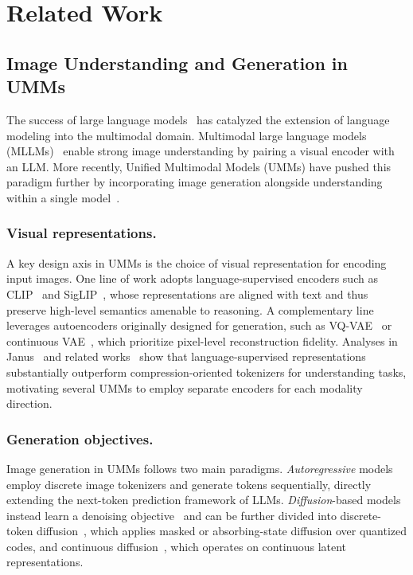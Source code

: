 \section{Related Work}
\subsection{Image Understanding and Generation in UMMs}
\label{subsec:taxonomy}
The success of large language models~\cite{floridi2020gpt, touvron2023llama} has catalyzed the extension of language modeling into the multimodal domain. Multimodal large language models (MLLMs)~\cite{bai2025qwen3, chen2024internvl, guo2025deepseek, liu2023visual} enable strong image understanding by pairing a visual encoder with an LLM. More recently, Unified Multimodal Models (UMMs) have pushed this paradigm further by incorporating image generation alongside understanding within a single model~\cite{team2024chameleon, wu2025janus, deng2025bagel, xin2025lumina, chen2505blip3}.


\vspace{-10pt}
\subsubsection{Visual representations.}
A key design axis in UMMs is the choice of visual representation for encoding input images. One line of work adopts language-supervised encoders such as CLIP~\cite{radford2021clip} and SigLIP~\cite{zhai2023sigmoid}, whose representations are aligned with text and thus preserve high-level semantics amenable to reasoning. A complementary line leverages autoencoders originally designed for generation, such as VQ-VAE~\cite{van2017neural} or continuous VAE~\cite{kingma2013vae}, which prioritize pixel-level reconstruction fidelity. Analyses in Janus~\cite{chen2025januspro,wu2025janus} and related works~\cite{tong2024cambrian} show that language-supervised representations substantially outperform compression-oriented tokenizers for understanding tasks, motivating several UMMs to employ separate encoders for each modality direction.


\vspace{-10pt}
\subsubsection{Generation objectives.}
Image generation in UMMs follows two main paradigms. \emph{Autoregressive} models~\cite{team2024chameleon, cui2025emu3} employ discrete image tokenizers and generate tokens sequentially, directly extending the next-token prediction framework of LLMs. \emph{Diffusion}-based models instead learn a denoising objective~\cite{ho2020ddpm, song2020ddim, lipman2022flow} and can be further divided into discrete-token diffusion~\cite{yang2025mmada, xin2025lumina}, which applies masked or absorbing-state diffusion over quantized codes, and continuous diffusion~\cite{zhou2024transfusion, chen2505blip3}, which operates on continuous latent representations.

